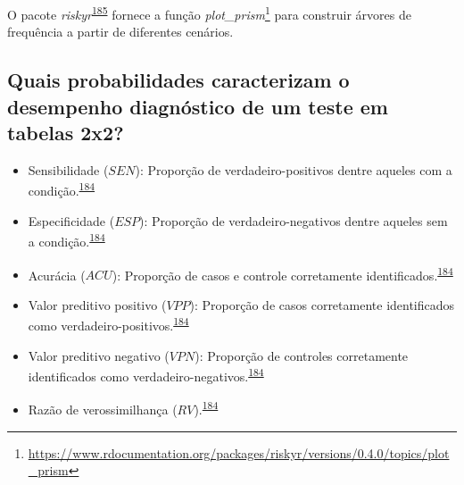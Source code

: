 \documentclass[
  a4paper,
]{book}
\renewcommand{\href}[2]{#2\footnote{\url{#1}}}
\newenvironment{infobox}[1]
  {
  \begin{itemize}
  \renewcommand{\labelitemi}{
    \raisebox{-.7\height}[0pt][0pt]{
      {\setkeys{Gin}{width=3em,keepaspectratio}
        \texttt{[image: \#1]}}
    }
  }
  \setlength{\fboxsep}{1em}
  \begin{blackbox}
  \item
  }
  {
  \end{blackbox}
  \end{itemize}
  }
\begin{document}
\begin{infobox}{images/Rlogo}
O pacote \emph{riskyr}\textsuperscript{\protect\hyperlink{ref-riskyr}{185}} fornece a função \href{https://www.rdocumentation.org/packages/riskyr/versions/0.4.0/topics/plot_prism}{\emph{plot\_prism}} para construir árvores de frequência a partir de diferentes cenários.

\end{infobox}

\hypertarget{quais-probabilidades-caracterizam-o-desempenho-diagnuxf3stico-de-um-teste-em-tabelas-2x2}{%
\subsection{Quais probabilidades caracterizam o desempenho diagnóstico de um teste em tabelas 2x2?}\label{quais-probabilidades-caracterizam-o-desempenho-diagnuxf3stico-de-um-teste-em-tabelas-2x2}}

\begin{itemize}
\item
  Sensibilidade (\(SEN\)): Proporção de verdadeiro-positivos dentre aqueles com a condição.\textsuperscript{\protect\hyperlink{ref-greenhalgh1997b}{184}}
\item
  Especificidade (\(ESP\)): Proporção de verdadeiro-negativos dentre aqueles sem a condição.\textsuperscript{\protect\hyperlink{ref-greenhalgh1997b}{184}}
\item
  Acurácia (\(ACU\)): Proporção de casos e controle corretamente identificados.\textsuperscript{\protect\hyperlink{ref-greenhalgh1997b}{184}}
\item
  Valor preditivo positivo (\(VPP\)): Proporção de casos corretamente identificados como verdadeiro-positivos.\textsuperscript{\protect\hyperlink{ref-greenhalgh1997b}{184}}
\item
  Valor preditivo negativo (\(VPN\)): Proporção de controles corretamente identificados como verdadeiro-negativos.\textsuperscript{\protect\hyperlink{ref-greenhalgh1997b}{184}}
\item
  Razão de verossimilhança (\(RV\)).\textsuperscript{\protect\hyperlink{ref-greenhalgh1997b}{184}}
\end{itemize}
\end{document}
